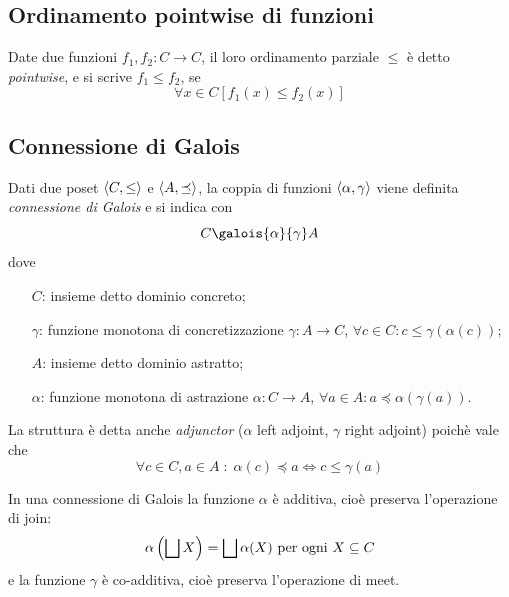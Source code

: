 \subsection{Ordinamento pointwise di funzioni}

Date due funzioni $f_1, f_2 : C \to C$, il loro ordinamento parziale $\le$ è detto \emph{pointwise}, e si scrive $f_1 \le f_2$, se
\[ \forall x \in C \left[ f_1(x) \le f_2(x) \right] \]

\subsection{Connessione di Galois}\label{sec:galois}

\begin{definition}
Dati due poset $\langle C, \le \rangle$ e $\langle A, \preceq \rangle$, la coppia di funzioni $\langle \alpha, \gamma \rangle$ viene definita \emph{connessione di Galois} e si indica con 
\[ C \galois{\alpha}{\gamma} A \]
dove
\begin{itemize}
    \item[$C$:] insieme detto dominio concreto;
    \item[$\gamma$:] funzione monotona di concretizzazione $\gamma : A \to C$, $\forall c \in C : c \le \gamma(\alpha(c))$;
    \item[$A$:] insieme detto dominio astratto;
    \item[$\alpha$:] funzione monotona di astrazione $\alpha : C \to A$, $\forall a \in A : a \preceq \alpha(\gamma(a))$.
\end{itemize}
\end{definition}

\begin{definition}
La struttura è detta anche \emph{adjunctor} ($\alpha$ left adjoint, $\gamma$ right adjoint) poichè vale che
$$\forall c \in C, a \in A \; : \; \alpha(c) \preceq a \Leftrightarrow c \le \gamma(a)$$
\end{definition}

\begin{definition}
In una connessione di Galois la funzione $\alpha$ è additiva, cioè preserva l'operazione di join: 
$$\alpha\left(\join[X]\right) = \join[\alpha(X)] \text{ per ogni } X \subseteq C$$
e la funzione $\gamma$ è co-additiva, cioè preserva l'operazione di meet.
\end{definition}

